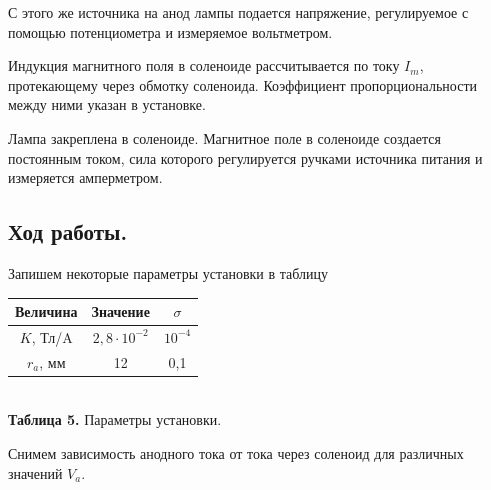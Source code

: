 \documentclass[a4paper, 12pt]{article}%
\begin{document}
С этого же источника на анод лампы подается напряжение, регулируемое с помощью потенциометра и измеряемое вольтметром.

Индукция магнитного поля в соленоиде рассчитывается по току $I_m$, протекающему через обмотку соленоида. Коэффициент пропорциональности между ними указан в установке.

Лампа закреплена в соленоиде. Магнитное поле в соленоиде создается постоянным током, сила которого регулируется ручками источника питания и измеряется амперметром.
\newpage
\subsection*{Ход работы.}
Запишем некоторые параметры установки в таблицу
\begin{center}
\begin{tabular}{|c|c|c|}
\hline
Величина & Значение & $\sigma$ \\ \hline
$K$, Тл/A & $2,8 \cdot 10^{-2}$ & $10^{-4}$ \\ \hline
$r_a$, мм & 12 & 0,1 \\ \hline
\end{tabular}\\
\textbf{Таблица 5.} Параметры установки.
\end{center}
Снимем зависимость анодного тока от тока через соленоид для различных значений $V_a$.
\end{document}
